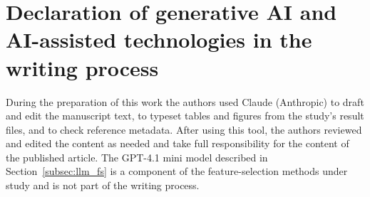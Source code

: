 \documentclass[preprint,12pt]{elsarticle}
\begin{document}
\section*{Declaration of generative AI and AI-assisted technologies in the writing process}
During the preparation of this work the authors used Claude (Anthropic) to draft and edit the manuscript text, to typeset tables and figures from the study's result files, and to check reference metadata. After using this tool, the authors reviewed and edited the content as needed and take full responsibility for the content of the published article. The GPT-4.1 mini model described in Section~\ref{subsec:llm_fs} is a component of the feature-selection methods under study and is not part of the writing process.

\end{document}
